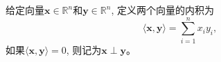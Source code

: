


\begin{definition}[向量内积]
    给定向量$\bm{x} \in \mathbb{R}^{n}$和$\bm{y} \in \mathbb{R}^{n}$, 定义两个向量的内积为
    \begin{equation}
        \langle\bm{x}, \bm{y}\rangle=\sum_{i=1}^{n} x_{i} y_{i},
        \nonumber
    \end{equation}
如果$\langle\bm{x}, \bm{y}\rangle=0$, 则记为$\bm{x} \perp \bm{y}$。
\end{definition}

